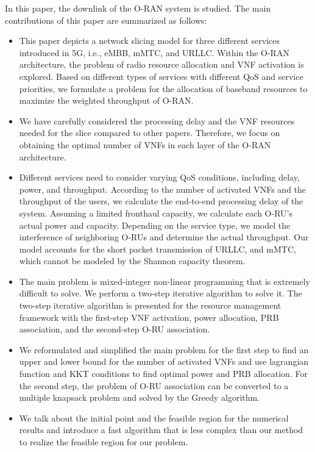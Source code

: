 \documentclass[12pt, letterpaper]{article}
\begin{document}
{In this paper, the downlink of the O-RAN system is studied. The main contributions of this paper are summarized as follows:
\begin{itemize}
\item This paper depicts a network slicing model for three different services introduced in 5G, i.e., eMBB, mMTC, and URLLC. Within the O-RAN architecture, the problem of radio resource allocation and VNF activation is explored.
Based on different types of services with different QoS and service priorities, we formulate a problem for the allocation of baseband resources to maximize the weighted throughput of O-RAN.
\item We have carefully considered the processing delay and the VNF resources needed for the slice compared to other papers. Therefore, we focus on obtaining the optimal number of VNFs in each layer of the O-RAN architecture. 
\item Different services need to consider varying QoS conditions, including delay, power, and throughput. According to the number of activated VNFs and the throughput of the users, we calculate the end-to-end processing delay of the system.
Assuming a limited fronthaul capacity, we calculate each O-RU's actual power and capacity. Depending on the service type, we model the interference of neighboring O-RUs and determine the actual throughput. Our model accounts for the short packet transmission of URLLC, and mMTC, which cannot be modeled by the Shannon capacity theorem.
\item The main problem is mixed-integer non-linear programming that is extremely difficult to solve.
We perform a two-step iterative algorithm to solve it.
The two-step iterative algorithm is presented for the resource management framework with the first-step VNF activation, power allocation, PRB association, and the second-step O-RU association.
\item We reformulated and simplified the main problem for the first step to find an upper and lower bound for the number of activated VNFs and use lagrangian function and KKT conditions to find optimal power and PRB allocation.
For the second step, the problem of O-RU association can be converted to a multiple knapsack problem and solved by the Greedy algorithm.
\item We talk about the initial point and the feasible region for the numerical results and introduce a fast algorithm that is less complex than our method to realize the feasible region for our problem.
\end{itemize}

}
\end{document}

